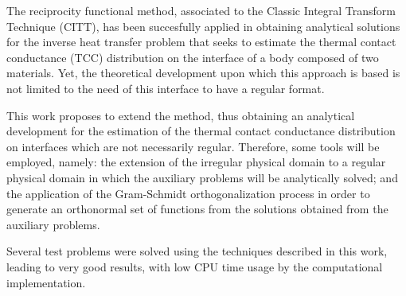\documentclass[msc,numbers, fleqn]{coppe}
\numberwithin{figure}{section}
\numberwithin{table}{section}
\numberwithin{equation}{section}
\begin{document}
  \begin{foreignabstract}

The reciprocity functional method, associated to the Classic Integral Transform Technique (CITT), has been succesfully applied in obtaining analytical
solutions for the inverse heat transfer problem that seeks to estimate the thermal contact conductance (TCC) distribution on the interface of a body composed of
two materials. Yet, the theoretical development upon which this approach is based is not limited to the need of this interface to have a regular format.

This work proposes to extend the method, thus obtaining an analytical development for the estimation of the thermal contact conductance distribution on interfaces which
are not necessarily regular. Therefore, some tools will be employed, namely: the extension of the irregular physical domain to a regular physical domain in
which the auxiliary problems will be analytically solved; and the application of the Gram-Schmidt orthogonalization process in order to generate an orthonormal set
of functions from the solutions obtained from the auxiliary problems.

Several test problems were solved using the techniques described in this work, leading to very good results, with low CPU time usage by the computational implementation.
 
  \end{foreignabstract}

\tableofcontents
 \listoffigures
 \listoftables
 \printlosymbols
 \printloabbreviations

  \mainmatter
  












%

%



\newpage

\backmatter  


\appendix

%
  
\end{document}
